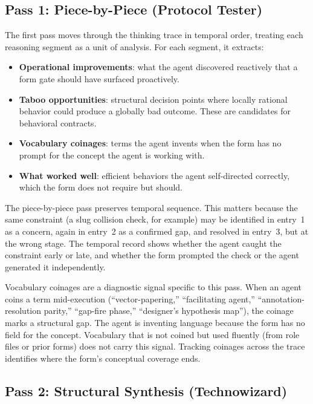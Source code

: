 \documentclass[11pt,a4paper]{article}
\begin{document}
\subsection{Pass 1: Piece-by-Piece (Protocol Tester)}

The first pass moves through the thinking trace in temporal order, treating
each reasoning segment as a unit of analysis. For each segment, it extracts:

\begin{itemize}
  \item \textbf{Operational improvements}: what the agent discovered reactively
    that a form gate should have surfaced proactively.
  \item \textbf{Taboo opportunities}: structural decision points where locally
    rational behavior could produce a globally bad outcome. These are
    candidates for behavioral contracts.
  \item \textbf{Vocabulary coinages}: terms the agent invents when the form has
    no prompt for the concept the agent is working with.
  \item \textbf{What worked well}: efficient behaviors the agent self-directed
    correctly, which the form does not require but should.
\end{itemize}

The piece-by-piece pass preserves temporal sequence. This matters because the
same constraint (a slug collision check, for example) may be identified in
entry~1 as a concern, again in entry~2 as a confirmed gap, and resolved in
entry~3, but at the wrong stage. The temporal record shows whether the agent
caught the constraint early or late, and whether the form prompted the check or
the agent generated it independently.

Vocabulary coinages are a diagnostic signal specific to this pass. When an
agent coins a term mid-execution (``vector-papering,'' ``facilitating agent,''
``annotation-resolution parity,'' ``gap-fire phase,'' ``designer's hypothesis
map''), the coinage marks a structural gap. The agent is inventing language
because the form has no field for the concept. Vocabulary that is not coined
but used fluently (from role files or prior forms) does not carry this signal.
Tracking coinages across the trace identifies where the form's conceptual
coverage ends.

\subsection{Pass 2: Structural Synthesis (Technowizard)}
\end{document}
